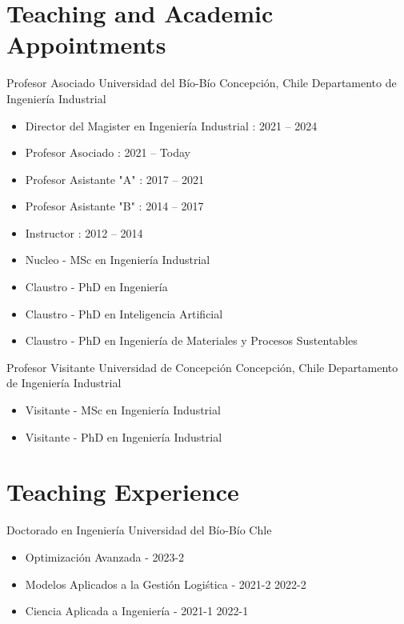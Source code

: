 \section{Teaching and Academic Appointments}

{Profesor Asociado}
{Universidad del B\'io-B\'io}
{Concepci\'on, Chile}
{Departamento de Ingenier\'ia Industrial}
{\begin{itemize}
\item Director del Magister en Ingenier\'ia Industrial : 2021 -- 2024
\item Profesor Asociado      : 2021 -- Today
\item Profesor Asistante "A" : 2017 -- 2021
\item Profesor Asistante "B" : 2014 -- 2017
\item Instructor             : 2012 -- 2014
\item Nucleo      - MSc en Ingenier\'ia Industrial
\item Claustro    - PhD en Ingenier\'ia
\item Claustro    - PhD en Inteligencia Artificial
\item Claustro    - PhD en Ingenier\'ia de Materiales y Procesos Sustentables
\end{itemize}}

{Profesor Visitante}
{Universidad de Concepci\'on}
{Concepci\'on, Chile}
{Departamento de Ingenier\'ia Industrial}
{\begin{itemize}
\item Visitante - MSc en Ingenier\'ia Industrial
\item Visitante - PhD en Ingenier\'ia Industrial
\end{itemize}}

\section{Teaching Experience}


{Doctorado en Ingenier\'ia}
{Universidad del B\'io-B\'io}
{Chle}
{}
{\begin{itemize}
\item Optimizaci\'on Avanzada - 2023-2
\item Modelos Aplicados a la Gesti\'on Logi\'stica - 2021-2 2022-2
\item Ciencia Aplicada a Ingenier\'ia - 2021-1 2022-1
\end{itemize}}

